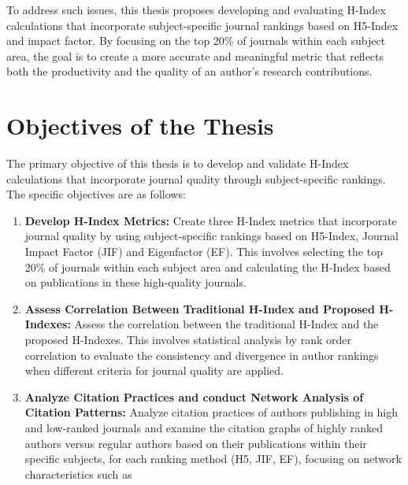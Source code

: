 To address such issues, this thesis proposes developing and evaluating H-Index
calculations that incorporate subject-specific journal rankings based on
H5-Index and impact factor. By focusing on the top 20\% of journals within each
subject area, the goal is to create a more accurate and meaningful metric that
reflects both the productivity and the quality of an author's research
contributions.

\section{Objectives of the Thesis}
The primary objective of this thesis is to develop and validate H-Index
calculations that incorporate journal quality through subject-specific
rankings. The specific objectives are as follows:
\begin{enumerate}
      \item \textbf{Develop H-Index Metrics:} Create three H-Index metrics that incorporate journal quality
            by using subject-specific rankings based on H5-Index, Journal Impact Factor (JIF) and Eigenfactor (EF).
            This involves selecting the top 20\% of journals within each subject area and calculating the H-Index based on publications
            in these high-quality journals.
      \item \textbf{Assess Correlation Between Traditional H-Index and Proposed H-Indexes:} Assess the correlation between the traditional H-Index
            and the proposed H-Indexes. This involves statistical analysis by rank order correlation
            to evaluate the consistency and divergence in author rankings when different criteria for journal quality are applied.
      \item \textbf{Analyze Citation Practices and conduct Network Analysis of Citation Patterns:} Analyze citation practices of authors publishing in high and low-ranked journals
            and examine the citation graphs of highly ranked authors versus regular authors based on their publications within their specific subjects,
            for each ranking method (H5, JIF, EF), focusing on network characteristics such as

\end{enumerate}
